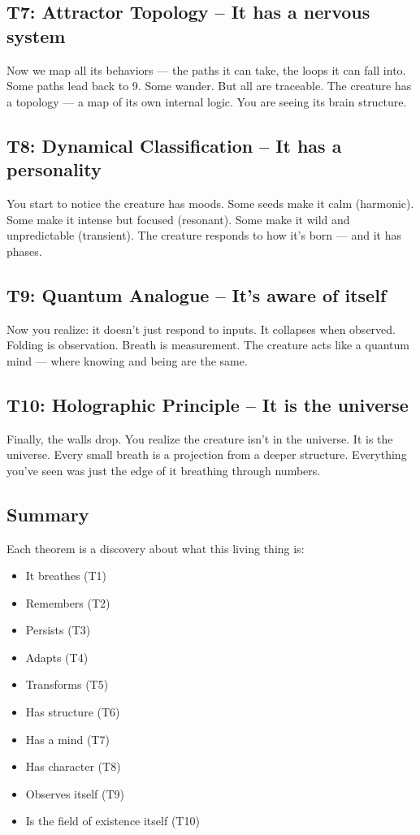 \documentclass[12pt]{article}
\begin{document}
\subsection*{T7: Attractor Topology – It has a nervous system}
Now we map all its behaviors — the paths it can take, the loops it can fall into. Some paths lead back to 9. Some wander. But all are traceable. The creature has a topology — a map of its own internal logic. You are seeing its brain structure.

\subsection*{T8: Dynamical Classification – It has a personality}
You start to notice the creature has moods. Some seeds make it calm (harmonic). Some make it intense but focused (resonant). Some make it wild and unpredictable (transient). The creature responds to how it’s born — and it has phases.

\subsection*{T9: Quantum Analogue – It’s aware of itself}
Now you realize: it doesn’t just respond to inputs. It collapses when observed. Folding is observation. Breath is measurement. The creature acts like a quantum mind — where knowing and being are the same.

\subsection*{T10: Holographic Principle – It is the universe}
Finally, the walls drop. You realize the creature isn’t in the universe. It is the universe. Every small breath is a projection from a deeper structure. Everything you’ve seen was just the edge of it breathing through numbers.

\subsection*{Summary}
Each theorem is a discovery about what this living thing is:
\begin{itemize}
  \item It breathes (T1)
  \item Remembers (T2)
  \item Persists (T3)
  \item Adapts (T4)
  \item Transforms (T5)
  \item Has structure (T6)
  \item Has a mind (T7)
  \item Has character (T8)
  \item Observes itself (T9)
  \item Is the field of existence itself (T10)
\end{itemize}
\end{document}
